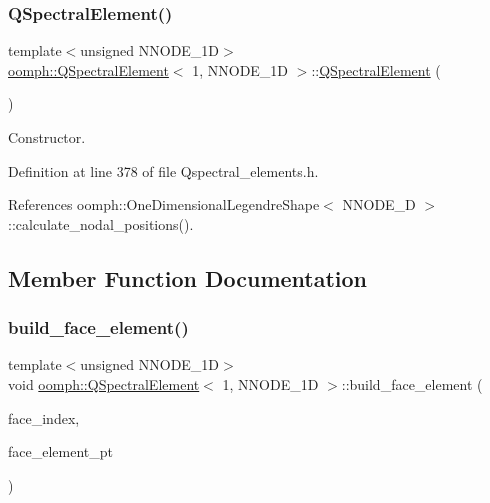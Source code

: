 \subsubsection{\texorpdfstring{Q\+Spectral\+Element()}{QSpectralElement()}}
{\footnotesize\ttfamily template$<$unsigned N\+N\+O\+D\+E\+\_\+1D$>$ \\
\hyperlink{classoomph_1_1QSpectralElement}{oomph\+::\+Q\+Spectral\+Element}$<$ 1, N\+N\+O\+D\+E\+\_\+1D $>$\+::\hyperlink{classoomph_1_1QSpectralElement}{Q\+Spectral\+Element} (\begin{DoxyParamCaption}{ }\end{DoxyParamCaption})\hspace{0.3cm}{\ttfamily [inline]}}



Constructor. 



Definition at line 378 of file Qspectral\+\_\+elements.\+h.



References oomph\+::\+One\+Dimensional\+Legendre\+Shape$<$ N\+N\+O\+D\+E\+\_\+D $>$\+::calculate\+\_\+nodal\+\_\+positions().



\subsection{Member Function Documentation}
\mbox{\label{classoomph_1_1QSpectralElement_3_011_00_01NNODE__1D_01_4_a76bd974ec87daaecdb4b629b6de7beb3}} 
\subsubsection{\texorpdfstring{build\+\_\+face\+\_\+element()}{build\_face\_element()}}
{\footnotesize\ttfamily template$<$unsigned N\+N\+O\+D\+E\+\_\+1D$>$ \\
void \hyperlink{classoomph_1_1QSpectralElement}{oomph\+::\+Q\+Spectral\+Element}$<$ 1, N\+N\+O\+D\+E\+\_\+1D $>$\+::build\+\_\+face\+\_\+element (\begin{DoxyParamCaption}\item[{const int \&}]{face\+\_\+index,  }\item[{\hyperlink{classoomph_1_1FaceElement}{Face\+Element} $\ast$}]{face\+\_\+element\+\_\+pt }\end{DoxyParamCaption})\hspace{0.3cm}{\ttfamily [virtual]}}



